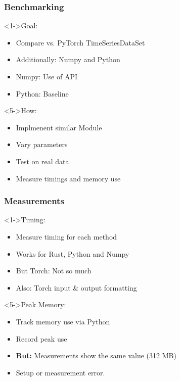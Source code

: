 \documentclass[t,english]{beamer}
\begin{document}

\begin{frame}
  \frametitle{Benchmarking}
  \begin{block}<1->{Goal:}
    \begin{itemize}
      \item<1-> Compare vs. PyTorch TimeSeriesDataSet
      \item<2-> Additionally: Numpy and Python
      \item <3-> Numpy: Use of API
      \item <4-> Python: Baseline
    \end{itemize}
  \end{block}

  \begin{block}<5->{How:}
    \begin{itemize}
      \item<5-> Implmenent similar Module
      \item<6-> Vary parameters
      \item <7-> Test on real data
      \item <8-> Measure timings and memory use
    \end{itemize}
  \end{block}
\end{frame}

\begin{frame}
  \frametitle{Measurements}
  \begin{block}<1->{Timing:}
    \begin{itemize}
      \item<1-> Measure timing for each method
      \item<2-> Works for Rust, Python and Numpy
      \item <3-> But Torch: Not so much
      \item <4-> Also: Torch input \& output formatting
    \end{itemize}
  \end{block}

  \begin{block}<5->{Peak Memory:}
    \begin{itemize}
      \item<5-> Track memory use via Python
      \item <6-> Record peak use
      \item <7-> \textbf{But:} Measurements show the same value (312 MB)
      \item <8-> Setup or measurement error.
    \end{itemize}
  \end{block}
\end{frame}
\end{document}
